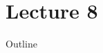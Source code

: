\documentclass{beamer}
\begin{document}
\part{Lecture 8}

\begin{frame}
\titlepage
\end{frame}





\begin{frame}{Outline}
    \tableofcontents[part=8]
\end{frame}
\end{document}
